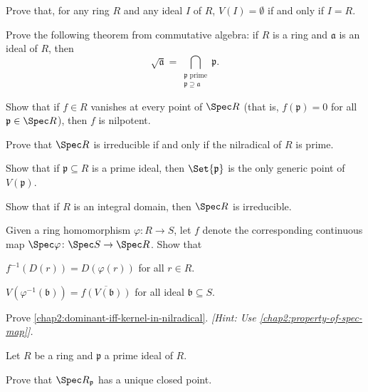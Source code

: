 \begin{problems}
	\item Prove that, for any ring $R$ and any ideal $I$ of $R$, $V(I) = \emptyset$ if and only if $I = R$.
	
	\item Prove the following theorem from commutative algebra: if $R$ is a ring and $\mathfrak{a}$ is an ideal of $R$, then
	\begin{equation*}
		\sqrt{\mathfrak{a}} = \bigcap_{\substack{\mathfrak{p} \text{ prime} \\ \mathfrak{p} \supseteq \mathfrak{a}}} \mathfrak{p}.
	\end{equation*}
	
	\item Show that if $f \in R$ vanishes at every point of $\Spec R$ (that is, $f(\mathfrak{p}) = 0$ for all $\mathfrak{p} \in \Spec R$), then $f$ is nilpotent.
	
	
	\item Prove that $\Spec R$ is irreducible if and only if the nilradical of $R$ is prime.
	
	\item Show that if $\mathfrak{p} \subseteq R$ is a prime ideal, then $\Set{\mathfrak{p}}$ is the only generic point of $V(\mathfrak{p})$.
	
	\item Show that if $R$ is an integral domain, then $\Spec R$ is irreducible.
	
	\item \label{chap2:property-of-spec-map} Given a ring homomorphism $\varphi \colon R \to S$, let $f$ denote the corresponding continuous map $\Spec \varphi \colon \Spec S \to \Spec R$. Show that 
	\begin{problems}
		\item $f^{-1}(D(r)) = D(\varphi(r))$ for all $r \in R$.
		
		\item $V(\varphi^{-1}(\mathfrak{b})) = \overline{f(V(\mathfrak{b}))}$ for all ideal $\mathfrak{b} \subseteq S$.
	\end{problems}
	
	\item \label{chap2:dominant-iff-kernel-in-nilradical-problem} Prove \cref{chap2:dominant-iff-kernel-in-nilradical}. \textit{[Hint: Use \cref{chap2:property-of-spec-map}].}
	
	\item Let $R$ be a ring and $\mathfrak{p}$ a prime ideal of $R$. 
	\begin{problems}
		\item Prove that $\Spec R_{\mathfrak{p}}$ has a unique closed point.
		

\end{problems}
\end{problems}
